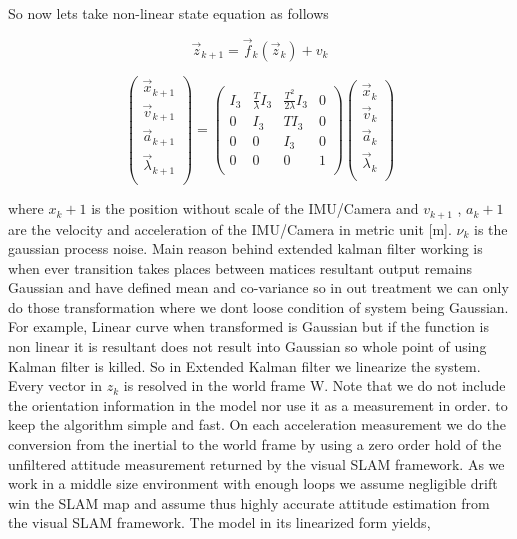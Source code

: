 So now lets take non-linear state equation as follows

\begin{equation}
\overrightarrow{z}_{k+1}= \overrightarrow{f}_k (\overrightarrow{z}_k) + v_k 
\end{equation}

\begin{equation} 
\begin{pmatrix}
  \overrightarrow{x}_{k+1} \\
  \overrightarrow{v}_{k+1} \\
  \overrightarrow{a}_{k+1} \\
  \overrightarrow{\lambda}_{k+1} \\
 \end{pmatrix}
 =
 \begin{pmatrix}
  I_3 & \frac{T}{\lambda}I_3  & \frac{T^2}{2 \lambda} I_3 & 0\\
  0 & I_3 & T I_3 & 0 \\
  0 & 0 & I_3 & 0 \\
  0 & 0 & 0 & 1\\
 \end{pmatrix} 
\begin{pmatrix}
\overrightarrow{x}_{k} \\
  \overrightarrow{v}_{k} \\
  \overrightarrow{a}_{k} \\
  \overrightarrow{\lambda}_{k} \\
 \end{pmatrix}
\end{equation}

where $x_k+1$ is the position without scale of the IMU/Camera and $v_{k+1}$ , $a_k+1$ are the velocity and acceleration of the IMU/Camera in metric unit [m]. $ν_k$ is the gaussian process noise. 
Main reason behind extended kalman filter working is when ever transition takes places between matices resultant output remains Gaussian and have defined mean and co-variance so in out treatment we can only do those transformation where we dont loose condition of system being Gaussian.
For example, Linear curve when transformed is Gaussian but if the function is non linear it is resultant does not result into Gaussian so whole point of using Kalman filter is killed.
So in Extended Kalman filter we linearize the system.
Every vector in $z_k$ is resolved in the world frame W. Note that we do not
include the orientation information in the model nor use it as a measurement in order. to keep the algorithm simple and fast. On each acceleration measurement we do the conversion from the inertial to the world frame by using a zero order hold  of the unfiltered attitude measurement returned by the visual SLAM framework. As we work in a middle size environment with enough loops we assume negligible drift win the SLAM map and assume thus highly accurate attitude estimation from the visual SLAM framework. The model in its linearized form yields,

